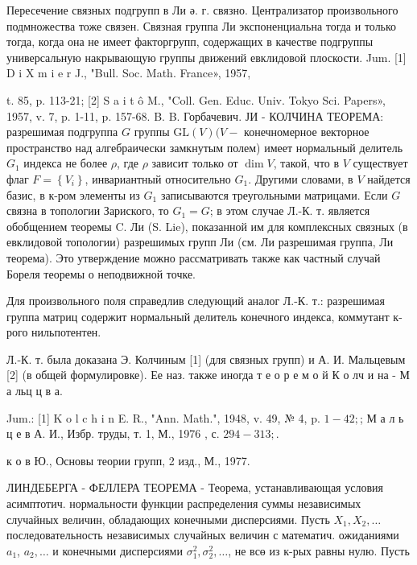 \documentclass[10pt]{article}
\begin{document}
Пересечение связных подгрупп в Ли ә. г. связно. Централизатор произвольного подмножества тоже связен. Связная группа Ли экспоненциальна тогда и только тогда, когда она не имеет факторгрупп, содержащих в качестве подгруппы универсальную накрывающую группы движений евклидовой плоскости. Jum. [1] D i X m i e r J., "Bull. Soc. Math. France», 1957,

t. 85, p. 113-21; [2] S a i t ô M., "Coll. Gen. Educ. Univ. Tokyo Sci. Papers», 1957, v. 7, p. 1-11, p. 157-68. B. B. Горбачевич. ЈИ - КОЛЧИНА ТЕОРЕМА: разрешимая подгруппа $G$ группы $\mathrm{GL}(V)(V-$ конечномерное векторное пространство над алгебраически замкнутым полем) имеет нормальный делитель $G_{1}$ индекса не более $\rho$, где $\rho$ зависит только от $\operatorname{dim} V$, такой, что в $V$ существует флаг $F=\left\{V_{i}\right\}$, инвариантный относительно $G_{1}$. Другими словами, в $V$ найдется базис, в к-ром элементы из $G_{1}$ записываются треугольными матрицами. Если $G$ связна в топологии Зариского, то $G_{1}=G$; в этом случае Л.-К. т. является обобщением теоремы C. Ли (S. Lie), показанной им для комплексных связных (в евклидовой топологии) разрешимых групп Ли (см. Ли разрешимая группа, Ли теорема). Это утверждение можно рассматривать также как частный случай Бореля теоремы о неподвижной точке.



Для произвольного поля справедлив следующий аналог Л.-К. т.: разрешимая группа матриц содержит нормальный делитель конечного индекса, коммутант к-рого нильпотентен.



Л.-К. т. была доказана Э. Колчиным [1] (для связных групп) и А. И. Мальцевым [2] (в общей формулировке). Ее наз. также иногда т е о р е м о й К о лч и на - М а льц ц в а.



Jum.: [1] K o l c h i n E. R., "Ann. Math.", 1948, v. 49, № 4, p. $1-42 ;$; М а л ь ц е в А. И., Избр. труды, т. 1, М., 1976 , с. $294-313 ;$.

к о в Ю., Основы теории групп, 2 изд., М., 1977.



ЛИНДЕБЕРГА - ФЕЛЛЕРА ТЕОРЕМА - Теорема, устанавливающая условия асимптотич. нормальности функции распределения суммы независимых случайных величин, обладающих конечными дисперсиями. Пусть $X_{1}, X_{2}, \ldots$ последовательность независимых случайных величин с математич. ожиданиями $a_{1}$, $a_{2}, \ldots$ и конечными дисперсиями $\sigma_{1}^{2}, \sigma_{2}^{2}, \ldots$, не всө из к-рых равны нулю. Пусть
\end{document}
